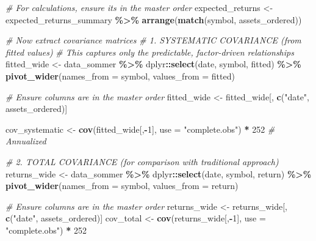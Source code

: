 \documentclass[
]{article}
\newenvironment{Shaded}{\begin{snugshade}}{\end{snugshade}}
\newcommand{\AttributeTok}[1]{\textcolor[rgb]{0.13,0.29,0.53}{#1}}
\newcommand{\CommentTok}[1]{\textcolor[rgb]{0.56,0.35,0.01}{\textit{#1}}}
\newcommand{\DecValTok}[1]{\textcolor[rgb]{0.00,0.00,0.81}{#1}}
\newcommand{\FunctionTok}[1]{\textcolor[rgb]{0.13,0.29,0.53}{\textbf{#1}}}
\newcommand{\NormalTok}[1]{#1}
\newcommand{\OtherTok}[1]{\textcolor[rgb]{0.56,0.35,0.01}{#1}}
\newcommand{\SpecialCharTok}[1]{\textcolor[rgb]{0.81,0.36,0.00}{\textbf{#1}}}
\newcommand{\StringTok}[1]{\textcolor[rgb]{0.31,0.60,0.02}{#1}}
\begin{document}
\begin{Shaded}
\begin{Highlighting}[]
\CommentTok{\# For calculations, ensure it\textquotesingle{}s in the master order}
\NormalTok{expected\_returns }\OtherTok{\textless{}{-}}\NormalTok{ expected\_returns\_summary }\SpecialCharTok{\%\textgreater{}\%}
  \FunctionTok{arrange}\NormalTok{(}\FunctionTok{match}\NormalTok{(symbol, assets\_ordered))}

\CommentTok{\# Now extract covariance matrices}
\CommentTok{\# 1. SYSTEMATIC COVARIANCE (from fitted values)}
\CommentTok{\# This captures only the predictable, factor{-}driven relationships}
\NormalTok{fitted\_wide }\OtherTok{\textless{}{-}}\NormalTok{ data\_sommer }\SpecialCharTok{\%\textgreater{}\%}
\NormalTok{  dplyr}\SpecialCharTok{::}\FunctionTok{select}\NormalTok{(date, symbol, fitted) }\SpecialCharTok{\%\textgreater{}\%}
  \FunctionTok{pivot\_wider}\NormalTok{(}\AttributeTok{names\_from =}\NormalTok{ symbol, }\AttributeTok{values\_from =}\NormalTok{ fitted)}

\CommentTok{\# Ensure columns are in the master order}
\NormalTok{fitted\_wide }\OtherTok{\textless{}{-}}\NormalTok{ fitted\_wide[, }\FunctionTok{c}\NormalTok{(}\StringTok{"date"}\NormalTok{, assets\_ordered)]}

\NormalTok{cov\_systematic }\OtherTok{\textless{}{-}} \FunctionTok{cov}\NormalTok{(fitted\_wide[,}\SpecialCharTok{{-}}\DecValTok{1}\NormalTok{], }\AttributeTok{use =} \StringTok{"complete.obs"}\NormalTok{) }\SpecialCharTok{*} \DecValTok{252}  \CommentTok{\# Annualized}

\CommentTok{\# 2. TOTAL COVARIANCE (for comparison with traditional approach)}
\NormalTok{returns\_wide }\OtherTok{\textless{}{-}}\NormalTok{ data\_sommer }\SpecialCharTok{\%\textgreater{}\%}
\NormalTok{  dplyr}\SpecialCharTok{::}\FunctionTok{select}\NormalTok{(date, symbol, return) }\SpecialCharTok{\%\textgreater{}\%}
  \FunctionTok{pivot\_wider}\NormalTok{(}\AttributeTok{names\_from =}\NormalTok{ symbol, }\AttributeTok{values\_from =}\NormalTok{ return)}

\CommentTok{\# Ensure columns are in the master order}
\NormalTok{returns\_wide }\OtherTok{\textless{}{-}}\NormalTok{ returns\_wide[, }\FunctionTok{c}\NormalTok{(}\StringTok{"date"}\NormalTok{, assets\_ordered)]}
\NormalTok{cov\_total }\OtherTok{\textless{}{-}} \FunctionTok{cov}\NormalTok{(returns\_wide[,}\SpecialCharTok{{-}}\DecValTok{1}\NormalTok{], }\AttributeTok{use =} \StringTok{"complete.obs"}\NormalTok{) }\SpecialCharTok{*} \DecValTok{252}


\end{Highlighting}
\end{Shaded}
\end{document}
